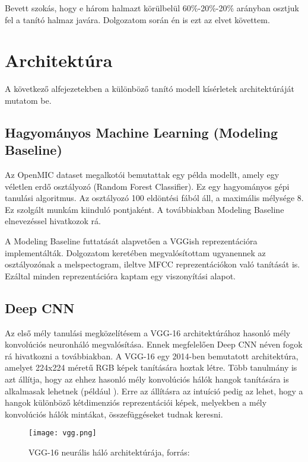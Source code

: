 Bevett szokás, hogy e három halmazt körülbelül 60\%-20\%-20\% arányban osztjuk fel a tanító halmaz javára. \cite{traintestvalid} Dolgozatom során én is ezt az elvet követtem.

\section{Architektúra}

A következő alfejezetekben a különböző tanító modell kísérletek architektúráját mutatom be.

\subsection{Hagyományos Machine Learning (Modeling Baseline)}

Az OpenMIC dataset megalkotói bemutattak egy példa modellt, amely egy véletlen erdő osztályozó (Random Forest Classifier). \cite{humphrey2018openmic} Ez egy hagyományos gépi tanulási algoritmus. Az osztályozó 100 eldöntési fából áll, a maximális mélysége 8. Ez szolgált munkám kiinduló pontjaként. A továbbiakban Modeling Baseline elnevezéssel hivatkozok rá.

A Modeling Baseline futtatását alapvetően a VGGish reprezentációra implementálták. Dolgozatom keretében megvalósítottam ugyanennek az osztályozónak a melspectogram, ileltve MFCC reprezentációkon való tanítását is. Ezáltal minden reprezentációra kaptam egy viszonyítási alapot.

\subsection{Deep CNN}

Az első mély tanulási megközelítésem a VGG-16 \cite{vgg} architektúrához hasonló mély konvolúciós neuronháló megvalósítása. Ennek megfelelően Deep CNN néven fogok rá hivatkozni a továbbiakban. A VGG-16 egy 2014-ben bemutatott architektúra, amelyet 224x224 méretű RGB képek tanítására hoztak létre. Több tanulmány is azt állítja, hogy az ehhez hasonló mély konvolúciós hálók hangok tanítására is alkalmasak lehetnek (például \cite{choi2017tutorial}). Erre az állításra az intuíció pedig az lehet, hogy a hangok különböző kétdimenziós reprezentációi képek, melyekben a mély konvolúciós hálók mintákat, összefüggéseket tudnak keresni.


\begin{figure}[H]
  \centering
  \texttt{[image: vgg.png]}
  \caption{VGG-16 neurális háló architektúrája, forrás: \cite{loukadakis2018}}
\end{figure}

